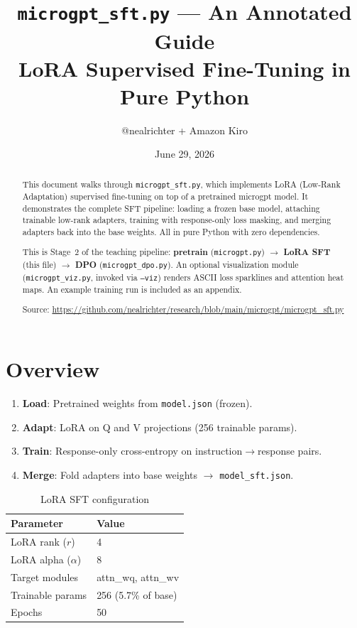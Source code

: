 \documentclass[11pt,a4paper]{article}
\title{\texttt{microgpt\_sft.py} --- An Annotated Guide\\[0.3em]
\large LoRA Supervised Fine-Tuning in Pure Python}
\author{@nealrichter + Amazon Kiro}
\date{June 29, 2026}
\begin{document}
\pagestyle{fancy}
\fancyhf{}
\fancyfoot[C]{\thepage}
\maketitle

\begin{abstract}
This document walks through \texttt{microgpt\_sft.py}, which implements LoRA (Low-Rank Adaptation) supervised fine-tuning on top of a pretrained microgpt model. It demonstrates the complete SFT pipeline: loading a frozen base model, attaching trainable low-rank adapters, training with response-only loss masking, and merging adapters back into the base weights. All in pure Python with zero dependencies.

This is Stage~2 of the teaching pipeline: \textbf{pretrain} (\texttt{microgpt.py}) $\to$ \textbf{LoRA SFT} (this file) $\to$ \textbf{DPO} (\texttt{microgpt\_dpo.py}). An optional visualization module (\texttt{microgpt\_viz.py}, invoked via \texttt{--viz}) renders ASCII loss sparklines and attention heat maps. An example training run is included as an appendix.

\medskip
\noindent Source: \url{https://github.com/nealrichter/research/blob/main/microgpt/microgpt_sft.py}
\end{abstract}

\tableofcontents

\section{Overview}

\begin{enumerate}
  \item \textbf{Load}: Pretrained weights from \texttt{model.json} (frozen).
  \item \textbf{Adapt}: LoRA on Q and V projections (256 trainable params).
  \item \textbf{Train}: Response-only cross-entropy on instruction$\to$response pairs.
  \item \textbf{Merge}: Fold adapters into base weights $\to$ \texttt{model\_sft.json}.
\end{enumerate}

\begin{table}[h]
\centering
\begin{tabular}{ll}
\toprule
\textbf{Parameter} & \textbf{Value} \\
\midrule
LoRA rank ($r$) & 4 \\
LoRA alpha ($\alpha$) & 8 \\
Target modules & attn\_wq, attn\_wv \\
Trainable params & 256 (5.7\% of base) \\
Epochs & 50 \\
\bottomrule
\end{tabular}
\caption{LoRA SFT configuration}
\end{table}
\end{document}
